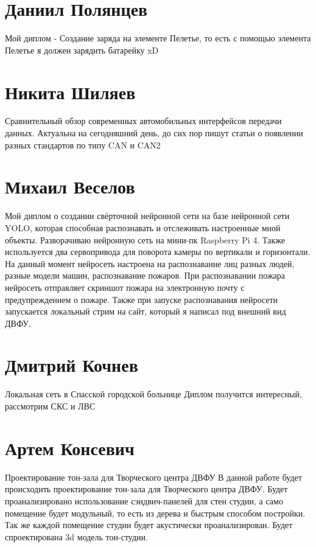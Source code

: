 \documentclass{article}
\begin{document}
\section*{Даниил Полянцев}
Мой диплом - Создание заряда на элементе Пелетье, то есть с помощью элемента Пелетье я должен зарядить батарейку xD

\section*{Никита Шиляев}

Сравнительный обзор современных автомобильных интерфейсов передачи данных. Актуальна на сегодняшний день, до сих пор пишут статьи о появлении разных стандартов по типу CAN и CAN2

\section*{Михаил Веселов}

Мой диплом о создании свёрточной нейронной сети на базе нейронной сети YOLO, которая способная распознавать и отслеживать настроенные мной объекты. Разворачиваю нейронную сеть на мини-пк Raspberry Pi 4. Также используется два сервопривода для поворота камеры по вертикали и горизонтали. На данный момент нейросеть настроена на распознавание лиц разных людей, разные модели машин, распознавание пожаров. При распознавании пожара нейросеть отправляет скриншот пожара на электронную почту с предупреждением о пожаре. Также при запуске распознавания нейросети запускается локальный стрим на сайт, который я написал под внешний вид ДВФУ.


\section*{Дмитрий Кочнев}
Локальная сеть в Спасской городской больнице
Диплом получится интересный, рассмотрим СКС и ЛВС

\section*{Артем Консевич}
Проектирование тон-зала для Творческого центра ДВФУ
В данной работе будет происходить проектирование тон-зала для Творческого центра ДВФУ. Будет проанализировано использование сэндвич-панелей для стен студии, а само  помещение будет модульный, то есть из дерева и быстрым способом постройки. Так же каждой помещение студии будет акустически проанализирован. Будет спроектирована 3d модель тон-студии.
\end{document}
